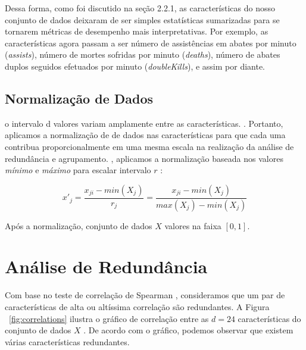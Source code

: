 Dessa forma, como foi discutido na seção 2.2.1, as características do nosso conjunto de dados deixaram de ser simples estatísticas sumarizadas para se tornarem métricas de desempenho mais interpretativas. Por exemplo, as características agora passam a ser número de assistências em abates por minuto (\textit{assists}), número de mortes sofridas por minuto (\textit{deaths}), número de abates duplos seguidos efetuados por minuto (\textit{doubleKills}), e assim por diante.

\subsection{Normalização de Dados}
 o intervalo d valores variam amplamente entre as características. . Portanto, aplicamos a normalização de de dados  \cite{zaki2014data} nas características  para que cada uma contribua proporcionalmente em uma mesma escala  na realização da análise de redundância e agrupamento. , aplicamos a normalização baseada nos valores \textit{mínimo} e \textit{máximo} para escalar   intervalo $r$ :

\begin{displaymath}
  x'_{j}=\frac{x_{ji} - min(X_{j})}{r_{j}}=\frac{x_{ji} - min(X_{j})}{max(X_{j})-min(X_{j})}
\end{displaymath}

Após a normalização,  conjunto de dados $X$  valores na faixa $[0, 1]$.

\section{Análise de Redundância}
 Com base no teste de correlação de Spearman \cite{xiao2015using}, consideramos que um par de características de alta ou altíssima correlação são redundantes. A Figura ~\ref{fig:correlations} ilustra o gráfico de correlação entre as $d=24$ características  do conjunto de dados $X$ . De acordo com o gráfico, podemos observar que existem várias características redundantes.

